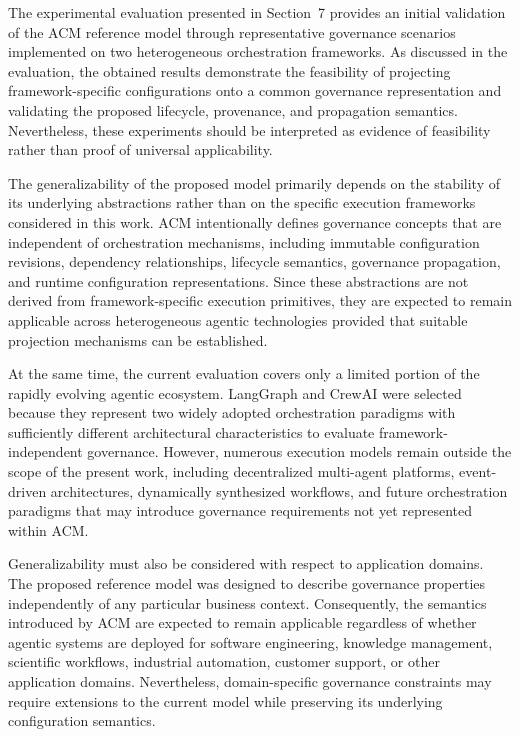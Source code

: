 \documentclass[10pt]{article}
\begin{document}
The experimental evaluation presented in Section~7 provides an initial validation of the ACM reference model through representative governance scenarios implemented on two heterogeneous orchestration frameworks. As discussed in the evaluation, the obtained results demonstrate the feasibility of projecting framework-specific configurations onto a common governance representation and validating the proposed lifecycle, provenance, and propagation semantics. Nevertheless, these experiments should be interpreted as evidence of feasibility rather than proof of universal applicability.

The generalizability of the proposed model primarily depends on the stability of its underlying abstractions rather than on the specific execution frameworks considered in this work. ACM intentionally defines governance concepts that are independent of orchestration mechanisms, including immutable configuration revisions, dependency relationships, lifecycle semantics, governance propagation, and runtime configuration representations. Since these abstractions are not derived from framework-specific execution primitives, they are expected to remain applicable across heterogeneous agentic technologies provided that suitable projection mechanisms can be established.

At the same time, the current evaluation covers only a limited portion of the rapidly evolving agentic ecosystem. LangGraph and CrewAI were selected because they represent two widely adopted orchestration paradigms with sufficiently different architectural characteristics to evaluate framework-independent governance. However, numerous execution models remain outside the scope of the present work, including decentralized multi-agent platforms, event-driven architectures, dynamically synthesized workflows, and future orchestration paradigms that may introduce governance requirements not yet represented within ACM.

Generalizability must also be considered with respect to application domains. The proposed reference model was designed to describe governance properties independently of any particular business context. Consequently, the semantics introduced by ACM are expected to remain applicable regardless of whether agentic systems are deployed for software engineering, knowledge management, scientific workflows, industrial automation, customer support, or other application domains. Nevertheless, domain-specific governance constraints may require extensions to the current model while preserving its underlying configuration semantics.
\end{document}
